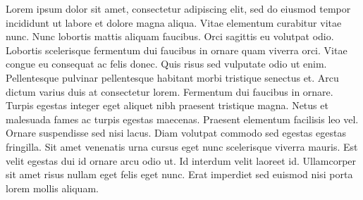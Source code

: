 Lorem ipsum dolor sit amet, consectetur adipiscing elit, sed do eiusmod
tempor incididunt ut labore et dolore magna aliqua. Vitae elementum
curabitur vitae nunc. Nunc lobortis mattis aliquam faucibus. Orci
sagittis eu volutpat odio. Lobortis scelerisque fermentum dui faucibus
in ornare quam viverra orci. Vitae congue eu consequat ac felis donec.
Quis risus sed vulputate odio ut enim. Pellentesque pulvinar
pellentesque habitant morbi tristique senectus et. Arcu dictum varius
duis at consectetur lorem. Fermentum dui faucibus in ornare. Turpis
egestas integer eget aliquet nibh praesent tristique magna. Netus et
malesuada fames ac turpis egestas maecenas. Praesent elementum facilisis
leo vel. Ornare suspendisse sed nisi lacus. Diam volutpat commodo sed
egestas egestas fringilla. Sit amet venenatis urna cursus eget nunc
scelerisque viverra mauris. Est velit egestas dui id ornare arcu odio
ut. Id interdum velit laoreet id. Ullamcorper sit amet risus nullam eget
felis eget nunc. Erat imperdiet sed euismod nisi porta lorem mollis
aliquam.
